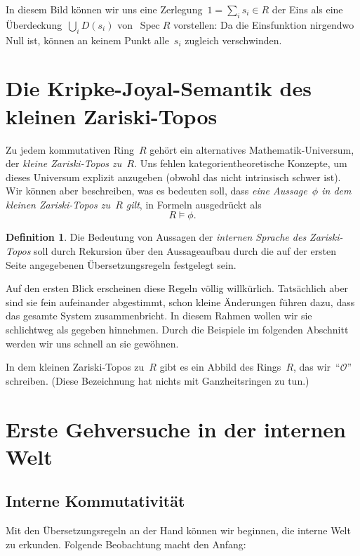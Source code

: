 \documentclass[a4paper,ngerman,12pt]{scrartcl}
\theoremstyle{definition}
\newtheorem{defn}{Definition}[section]
\theoremstyle{plain}
\theoremstyle{remark}
\renewcommand{\O}{\mathcal{O}}
\DeclareMathOperator{\Spec}{Spec}
\renewcommand{\_}{\mathpunct{.}\,}
\newcommand{\?}{\,{:}\,}
\begin{document}
In diesem Bild können wir uns eine Zerlegung~$1 = \sum_i s_i \in R$ der Eins
als eine Über\-de\-ckung~$\bigcup_i D(s_i)$ von~$\Spec R$ vorstellen: Da die
Einsfunktion nirgendwo Null ist, können an keinem Punkt alle~$s_i$ zugleich
verschwinden.


\section{Die Kripke-Joyal-Semantik des kleinen Zariski-Topos}

Zu jedem kommutativen Ring~$R$ gehört ein alternatives Mathematik-Universum,
der \emph{kleine Zariski-Topos zu~$R$}. Uns fehlen kategorientheoretische
Konzepte, um dieses Universum explizit anzugeben (obwohl das nicht intrinsisch
schwer ist). Wir können aber beschreiben, was es bedeuten soll, dass \emph{eine
Aussage~$\phi$ in dem kleinen Zariski-Topos zu~$R$ gilt}, in Formeln
ausgedrückt als
\[ R \models \phi. \]

\begin{defn}Die Bedeutung von Aussagen der \emph{internen Sprache des
Zariski-Topos} soll durch Rekursion über den Aussageaufbau durch die auf der
ersten Seite angegebenen Übersetzungsregeln festgelegt sein.\end{defn}

Auf den ersten Blick erscheinen diese Regeln völlig
willkürlich. Tatsächlich aber sind sie fein aufeinander abgestimmt, schon
kleine Änderungen führen dazu, dass das gesamte System zusammenbricht. In
diesem Rahmen wollen wir sie schlichtweg als gegeben hinnehmen. Durch die
Beispiele im folgenden Abschnitt werden wir uns schnell an sie gewöhnen.

In dem kleinen Zariski-Topos zu~$R$ gibt es ein Abbild des Rings~$R$, das
wir~"`$\O$"' schreiben. (Diese Bezeichnung hat nichts mit Ganzheitsringen zu tun.)


\section{Erste Gehversuche in der internen Welt}

\subsection{Interne Kommutativität}

Mit den Übersetzungsregeln an der Hand können wir beginnen, die interne Welt zu
erkunden. Folgende Beobachtung macht den Anfang:
\end{document}
